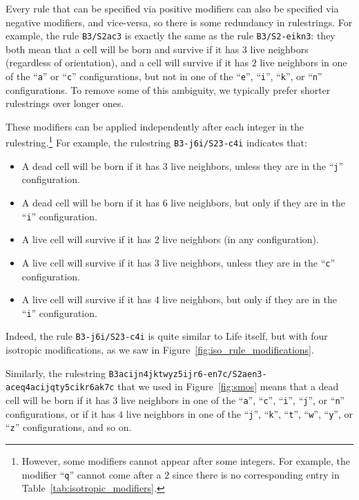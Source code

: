 Every rule that can be specified via positive modifiers can also be specified via negative modifiers, and vice-versa, so there is some redundancy in rulestrings. For example, the rule \texttt{B3/S2ac3} is exactly the same as the rule \texttt{B3/S2-eikn3}: they both mean that a cell will be born and survive if it has $3$ live neighbors (regardless of orientation), and a cell will survive if it has $2$ live neighbors in one of the ``\texttt{a}'' or ``\texttt{c}'' configurations, but not in one of the ``\texttt{e}'', ``\texttt{i}'', ``\texttt{k}'', or ``\texttt{n}'' configurations. To remove some of this ambiguity, we typically prefer shorter rulestrings over longer ones.

These modifiers can be applied independently after each integer in the rulestring.\footnote{However, some modifiers cannot appear after some integers. For example, the modifier ``\texttt{q}'' cannot come after a $2$ since there is no corresponding entry in Table~\ref{tab:isotropic_modifiers}.} For example, the rulestring \texttt{B3-j6i/S23-c4i} indicates that:\smallskip

\begin{itemize}
	\item A dead cell will be born if it has $3$ live neighbors, unless they are in the ``\texttt{j}'' configuration.\smallskip
	
	\item A dead cell will be born if it has $6$ live neighbors, but only if they are in the ``\texttt{i}'' configuration.\smallskip
	
	\item A live cell will survive if it has $2$ live neighbors (in any configuration).\smallskip
	
	\item A live cell will survive if it has $3$ live neighbors, unless they are in the ``\texttt{c}'' configuration.\smallskip
	
	\item A live cell will survive if it has $4$ live neighbors, but only if they are in the ``\texttt{i}'' configuration.\smallskip
\end{itemize}

\noindent Indeed, the rule \texttt{B3-j6i/S23-c4i} is quite similar to Life itself, but with four isotropic modifications, as we saw in Figure~\ref{fig:iso_rule_modifications}.

Similarly, the rulestring \texttt{B3acijn4jktwyz5ijr6-en7c/S2aen3-aceq4acijqty5cikr6ak7c} that we used in Figure~\ref{fig:smos} means that a dead cell will be born if it has $3$ live neighbors in one of the ``\texttt{a}'', ``\texttt{c}'', ``\texttt{i}'', ``\texttt{j}'', or ``\texttt{n}'' configurations, or if it has $4$ live neighbors in one of the ``\texttt{j}'', ``\texttt{k}'', ``\texttt{t}'', ``\texttt{w}'', ``\texttt{y}'', or ``\texttt{z}'' configurations, and so on.


